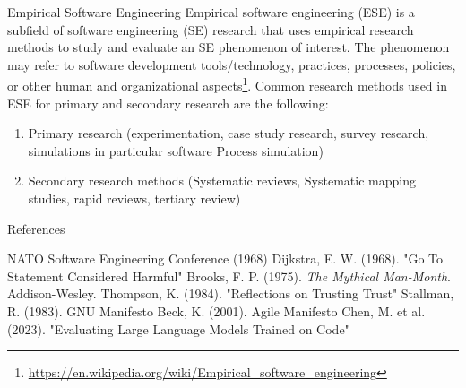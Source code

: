 \documentclass{beamer}
\begin{document}
\begin{frame}[t]{Empirical Software Engineering}
Empirical software engineering (ESE) is a subfield of software engineering (SE) research that uses empirical research methods to study and evaluate an SE phenomenon of interest. The phenomenon may refer to software development tools/technology, practices, processes, policies, or other human and organizational aspects\footnote{\url{https://en.wikipedia.org/wiki/Empirical_software_engineering}}. Common research methods used in ESE for primary and secondary research are the following:

\begin{enumerate}
    \item Primary research (experimentation, case study research, survey research, simulations in particular software Process simulation)
    \item Secondary research methods (Systematic reviews, Systematic mapping studies, rapid reviews, tertiary review)
\end{enumerate}
\end{frame}
\begin{frame}[t]{References}
\begin{thebibliography}{10}
 NATO Software Engineering Conference (1968)
 Dijkstra, E. W. (1968). "Go To Statement Considered Harmful"
 Brooks, F. P. (1975). \textit{The Mythical Man-Month}. Addison-Wesley. %
 Thompson, K. (1984). "Reflections on Trusting Trust"
 Stallman, R. (1983). GNU Manifesto
 Beck, K. (2001). Agile Manifesto
 Chen, M. et al. (2023). "Evaluating Large Language Models Trained on Code"
\end{thebibliography}
\end{frame}
\end{document}
